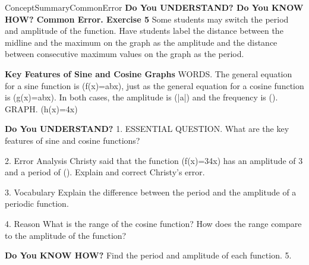 \documentclass{article}
\newenvironment{concept-summary}{}{}    %
\newenvironment{te-addendum}[2]{}{}     %
\newcommand{\answer}[1]{}               %
\newcommand{\placeholder}[2]{}          %
\newcommand{\te}[1]{}                   %
\begin{document}
\begin{te-addendum}{ConceptSummary}{CommonError}
\textbf{Do You UNDERSTAND? Do You KNOW HOW? Common Error. Exercise 5}
Some students may switch the period and amplitude of the function. Have students label the distance between the midline and the maximum on the graph as the amplitude and the distance between consecutive maximum values on the graph as the period.
\end{te-addendum}
\begin{concept-summary}
\textbf{Key Features of Sine and Cosine Graphs}
WORDS. The general equation for a sine function is (f(x)=a\sin bx), just as the general equation for a cosine function is (g(x)=a\cos bx). In both cases, the amplitude is (|a|) and the frequency is ().
GRAPH. (h(x)=\sin4x)
\placeholder{graph}{Red h(x)=1/2 sin4x on arrowed x,y grid, origin O; x labels-2pi,-pi,pi,2pi, gridpi/4; y labels-1,1 grid1/4; window-9pi/4 to9pi/4,-5/4 to5/4. Amplitude1/2, periodpi/2, curve crosses origin upward, maxima x=pi/8+kpi/2, minima3pi/8+kpi/2, continuation arrows at both ends.}
\te{Callout: The amplitude is the distance between a minimum or maximum point and the midline, or (\frac12).}
\te{Callout: The x-axis, or (y=0), is the midline, which is halfway between the maximum points and minimum points.}
\te{Callout: The period is (\frac\pi2), or the length of one cycle. The frequency is (\frac2\pi), because the function repeats 2 times from 0 to (\pi).}
\textbf{Do You UNDERSTAND?}
1. ESSENTIAL QUESTION. What are the key features of sine and cosine functions?
\answer{The key features of the sine and cosine functions may described in terms of domain and range, period and frequency, amplitude, and midline.}
\te{Printed "may described" retained; likely "may be described".}
2. Error Analysis Christy said that the function (f(x)=3\cos4x) has an amplitude of 3 and a period of (\frac{}). Explain and correct Christy's error.
\answer{The period is (\frac{2\pi}4), or (\frac\pi2), not (\frac\pi4).}
3. Vocabulary Explain the difference between the period and the amplitude of a periodic function.
\answer{The period is the interval of the domain before it repeats. The amplitude is the distance between the midline and the minimum or maximum.}
4. Reason What is the range of the cosine function? How does the range compare to the amplitude of the function?
\answer{(-1\leq y\leq1); The range is from minimum to maximum; the amplitude is half that distance.}
\textbf{Do You KNOW HOW?}
Find the period and amplitude of each function.
5.

\end{concept-summary}
\end{document}
